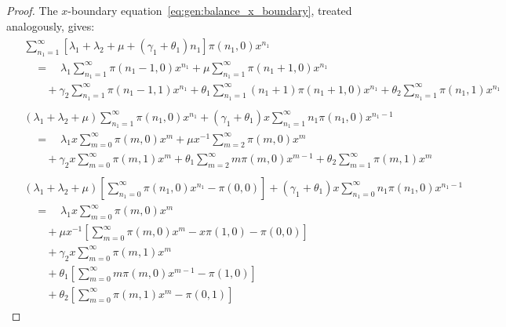 \begin{proof}
    The $x$-boundary equation~\eqref{eq:gen:balance_x_boundary}, treated analogously, gives:
    \begin{align}
        \begin{split}
            & \sum_{n_1=1}^{\infty} \left[ \lambda_1 + \lambda_2 + \mu + (\gamma_1 + \theta_1) n_1 \right] \pi(n_1, 0) x^{n_1} \\
            & \quad = \quad \lambda_1 \sum_{n_1=1}^{\infty} \pi(n_1-1,0) x^{n_1}
            + \mu \sum_{n_1=1}^{\infty} \pi(n_1+1,0) x^{n_1} \\
            & \quad \quad + \gamma_2 \sum_{n_1=1}^{\infty} \pi(n_1-1, 1) x^{n_1}
            + \theta_1 \sum_{n_1=1}^{\infty} (n_1+1) \pi(n_1+1, 0) x^{n_1}
            + \theta_2 \sum_{n_1=1}^{\infty} \pi(n_1, 1) x^{n_1}
        \end{split} \nonumber \\
        \begin{split}
            & (\lambda_1 + \lambda_2 + \mu) \sum_{n_1=1}^{\infty} \pi(n_1, 0) x^{n_1}
            + (\gamma_1 + \theta_1) x \sum_{n_1=1}^{\infty} n_1 \pi(n_1, 0) x^{n_1-1} \\
            & \quad = \quad \lambda_1 x \sum_{m=0}^{\infty} \pi(m, 0) x^{m}
            + \mu x^{-1} \sum_{m=2}^{\infty} \pi(m, 0) x^{m} \\
            & \quad \quad + \gamma_2 x \sum_{m=0}^{\infty} \pi(m, 1) x^{m}
            + \theta_1 \sum_{m=2}^{\infty} m \pi(m, 0) x^{m-1}
            + \theta_2 \sum_{m=1}^{\infty} \pi(m, 1) x^{m}
        \end{split} \nonumber \\
        \begin{split}
            & (\lambda_1 + \lambda_2 + \mu) \left[ \sum_{n_1=0}^{\infty} \pi(n_1, 0) x^{n_1} - \pi(0,0) \right]
            + (\gamma_1 + \theta_1) x \sum_{n_1=0}^{\infty} n_1 \pi(n_1, 0) x^{n_1-1} \\
            & \quad = \quad \lambda_1 x \sum_{m=0}^{\infty} \pi(m, 0) x^{m} \\
            & \quad \quad + \mu x^{-1} \left[ \sum_{m=0}^{\infty} \pi(m, 0) x^{m} - x \pi(1, 0) - \pi(0,0) \right] \\
            & \quad \quad + \gamma_2 x \sum_{m=0}^{\infty} \pi(m, 1) x^{m} \\
            & \quad \quad + \theta_1 \left[ \sum_{m=0}^{\infty} m \pi(m, 0) x^{m-1} - \pi(1, 0) \right] \\
            & \quad \quad + \theta_2 \left[ \sum_{m=0}^{\infty} \pi(m, 1) x^{m} - \pi(0, 1) \right]

\end{split}
\end{align}
\end{proof}
